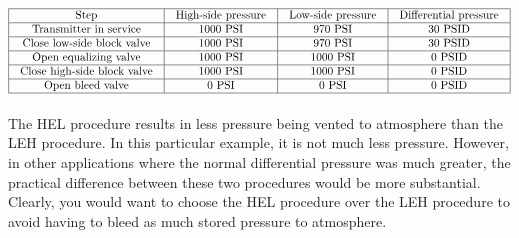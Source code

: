 $$\vbox{\offinterlineskip
\halign{\strut
\vrule \quad\hfil # \ \hfil & 
\vrule \quad\hfil # \ \hfil & 
\vrule \quad\hfil # \ \hfil & 
\vrule \quad\hfil # \ \hfil \vrule \cr
\noalign{\hrule}
%
Step & High-side pressure & Low-side pressure & Differential pressure \cr
%
\noalign{\hrule}
%
Transmitter in service & 1000 PSI & 970 PSI & 30 PSID \cr
%
\noalign{\hrule}
%
Close low-side block valve & 1000 PSI & 970 PSI & 30 PSID \cr
%
\noalign{\hrule}
%
Open equalizing valve & 1000 PSI & 1000 PSI & 0 PSID \cr
%
\noalign{\hrule}
%
Close high-side block valve & 1000 PSI & 1000 PSI & 0 PSID \cr
%
\noalign{\hrule}
%
Open bleed valve & 0 PSI & 0 PSI & 0 PSID \cr
%
\noalign{\hrule}
} %
}$$ %

\vskip 10pt

The HEL procedure results in less pressure being vented to atmosphere than the LEH procedure.  In this particular example, it is not much less pressure.  However, in other applications where the normal differential pressure was much greater, the practical difference between these two procedures would be more substantial.  Clearly, you would want to choose the HEL procedure over the LEH procedure to avoid having to bleed as much stored pressure to atmosphere.




